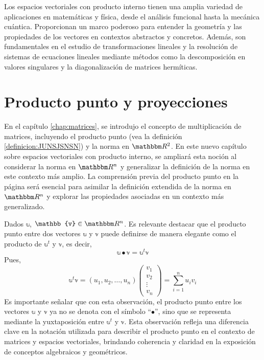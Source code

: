 Los espacios vectoriales con producto interno tienen una amplia variedad de aplicaciones en matemáticas y física, desde el análisis funcional hasta la mecánica cuántica. Proporcionan un marco poderoso para entender la geometría y las propiedades de los vectores en contextos abstractos y concretos. Además, son fundamentales en el estudio de transformaciones lineales y la resolución de sistemas de ecuaciones lineales mediante métodos como la descomposición en valores singulares y la diagonalización de matrices hermíticas.

\section{Producto punto y proyecciones}\label{sec:orto}

En el capítulo \ref{chap:matrices}, se introdujo el concepto de multiplicación de matrices, incluyendo el producto punto (vea la definición \ref{definicion:JUNSJSNSN}) y la norma en $\RR[2]$. En este nuevo capítulo sobre espacios vectoriales con producto interno, se ampliará esta noción al considerar la norma en \( \RR[n] \) y generalizar la definición de la norma en este contexto más amplio. La comprensión previa del producto punto en la página \pageref{definicion:JUNSJSNSN} será esencial para asimilar la definición extendida de la norma en \( \RR[n] \) y explorar las propiedades asociadas en un contexto más generalizado.

\begin{observation}\label{Obs:innerproduct}
    Dados $\mathbb{u}$, $\mathbb{v} \in \RR[n]$. Es relevante destacar que el producto punto entre dos vectores $\mathbb{u}$ y $\mathbb{v}$ puede definirse de manera elegante como el producto de $\mathbb{u}^t$ y $\mathbb{v}$, es decir,
    $$\mathbb{u} \bullet \mathbb{v} = \mathbb{u}^t \mathbb{v}$$
    Pues,
    $$\mathbb{u}^t \mathbb{v} = (u_1, u_2, \dots, u_n) \begin{pmatrix} v_1 \\ v_2 \\ \vdots \\ v_n \end{pmatrix} = \sum_{i=1}^n u_i v_i$$
    Es importante señalar que con esta observación, el producto punto entre los vectores \( \mathbb{u} \) y \( \mathbb{v} \) ya no se denota con el símbolo “$\bullet$”, sino que se representa mediante la yuxtaposición entre \( \mathbb{u}^t \) y \( \mathbb{v} \). Esta observación refleja una diferencia clave en la notación utilizada para describir el producto punto en el contexto de matrices y espacios vectoriales, brindando coherencia y claridad en la exposición de conceptos algebraicos y geométricos.
\end{observation}

